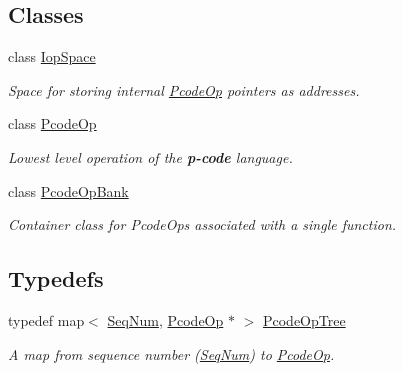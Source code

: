 \subsection*{Classes}
\begin{DoxyCompactItemize}
\item 
class \mbox{\hyperlink{class_iop_space}{Iop\+Space}}
\begin{DoxyCompactList}\small\item\em Space for storing internal \mbox{\hyperlink{class_pcode_op}{Pcode\+Op}} pointers as addresses. \end{DoxyCompactList}\item 
class \mbox{\hyperlink{class_pcode_op}{Pcode\+Op}}
\begin{DoxyCompactList}\small\item\em Lowest level operation of the {\bfseries{p-\/code}} language. \end{DoxyCompactList}\item 
class \mbox{\hyperlink{class_pcode_op_bank}{Pcode\+Op\+Bank}}
\begin{DoxyCompactList}\small\item\em Container class for Pcode\+Ops associated with a single function. \end{DoxyCompactList}\end{DoxyCompactItemize}
\subsection*{Typedefs}
\begin{DoxyCompactItemize}
\item 
typedef map$<$ \mbox{\hyperlink{class_seq_num}{Seq\+Num}}, \mbox{\hyperlink{class_pcode_op}{Pcode\+Op}} $\ast$ $>$ \mbox{\hyperlink{op_8hh_abaa8ab6f8d0f797e72a3cb80ff40e7fa}{Pcode\+Op\+Tree}}
\begin{DoxyCompactList}\small\item\em A map from sequence number (\mbox{\hyperlink{class_seq_num}{Seq\+Num}}) to \mbox{\hyperlink{class_pcode_op}{Pcode\+Op}}. \end{DoxyCompactList}\end{DoxyCompactItemize}
